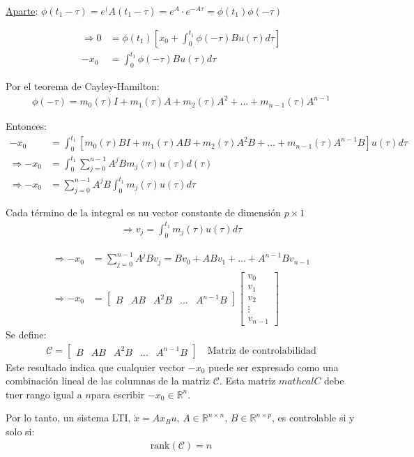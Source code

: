 \underline{Aparte}: $\phi(t_1-\tau)=e^({A(t_1-\tau)}=e^A\cdot e^{-A\tau}=\phi(t_1)\phi(-\tau)$

\begin{align*}
    \Longrightarrow 0 &=\phi(t_1)\left[x_0+\int_0^{t_1}\phi(-\tau)Bu(\tau)d\tau\right] \\
    -x_0 &= \int_0^{t_1}\phi(-\tau)Bu(\tau)d\tau
\end{align*}

Por el teorema de Cayley-Hamilton:
\begin{align*}
    \phi(-\tau)=m_0(\tau)I+m_1(\tau)A+m_2(\tau)A^2+...+m_{n-1}(\tau)A^{n-1}
\end{align*}

Entonces:
\begin{align*}
    -x_0 &= \int_0^{t_1}\left[m_0(\tau)BI+m_1(\tau)AB+m_2(\tau)A^2B+...+m_{n-1}(\tau)A^{n-1}B \right]u(\tau)d\tau\\
    \Longrightarrow -x_0 &= \int_0^{t_1} \sum_{j=0}^{n-1}A^jBm_j(\tau)u(\tau)d(\tau)\\
    \Longrightarrow -x_0 &= \sum_{j=0}^{n-1}A^jB \int_0^{t_1} m_j(\tau)u(\tau)d\tau
\end{align*}

Cada término de la integral es nu vector constante de dimensión $p\times 1$
\begin{align*}
    \Longrightarrow v_j = \int_0^{t_1}m_j(\tau)u(\tau)d\tau
\end{align*}

\begin{align*}
    \Longrightarrow -x_0 &= \sum_{j=0}^{n-1}A^jBv_j =Bv_0+ABv_1+...+A^{n-1}Bv_{n-1}\\
     \Longrightarrow -x_0 &= \left[
    \begin{array}{c|c|c|c|c}
     B & AB & A^2B & ... & A^{n-1}B
    \end{array}\right] \left[
    \begin{array}{c}
     v_0\\ \hline v_1 \\ \hline v_2 \\ \hline \vdots \\ \hline v_{n-1} 
    \end{array}\right]
\end{align*}
Se define:
\begin{align*}
    \mathcal{C}=\left[
    \begin{array}{c|c|c|c|c}
     B & AB & A^2B & ... & A^{n-1}B
    \end{array}\right] \quad \text{Matriz de controlabilidad}
\end{align*}
Este resultado indica que cualquier vector $-x_0$ puede ser expresado como una combinación lineal de las columnas de la matriz $\mathcal{C}$. Esta matriz $mathcal{C}$ debe tner rango igual a $n$para escribir $-x_0\in \mathbb{R}^n$.\\
\par Por lo tanto, un sistema LTI, $\dot{x}=Ax_Bu$, $A\in \mathbb{R}^{n\times n}$, $B\in \mathbb{R}^{n\times p}$, es controlable si y solo si:
\begin{align*}
    \text{rank}(\mathcal{C})=n
\end{align*}

